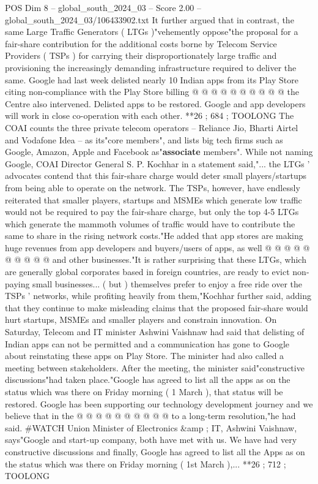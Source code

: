 \begin{textsample}{POS Dim 8 – global\_south\_2024\_03 – Score 2.00 – global\_south\_2024\_03/106433902.txt}
It further argued that in contrast, the same Large Traffic Generators ( LTGs )"vehemently oppose"the proposal for a fair-share contribution for the additional costs borne by Telecom Service Providers ( TSPs ) for carrying their disproportionately large traffic and provisioning the increasingly demanding infrastructure required to deliver the same.
Google had last week delisted nearly 10 Indian apps from its Play Store citing non-compliance with the Play Store billing @ @ @ @ @ @ @ @ @ @ the Centre also intervened.
Delisted apps to be restored.
Google and app developers will work in close co-operation with each other. **26 ; 684 ; TOOLONG The COAI counts the three private telecom operators -- Reliance Jio, Bharti Airtel and Vodafone Idea -- as its"core members", and lists big tech firms such as Google, Amazon, Apple and Facebook as"\textbf{associate} members".
While not naming Google, COAI Director General S.
P.
Kochhar in a statement said,"... the LTGs ' advocates contend that this fair-share charge would deter small players/startups from being able to operate on the network.
The TSPs, however, have endlessly reiterated that smaller players, startups and MSMEs which generate low traffic would not be required to pay the fair-share charge, but only the top 4-5 LTGs which generate the mammoth volumes of traffic would have to contribute the same to share in the rising network costs."He added that app stores are making huge revenues from app developers and buyers/users of apps, as well @ @ @ @ @ @ @ @ @ @ and other businesses."It is rather surprising that these LTGs, which are generally global corporates based in foreign countries, are ready to evict non-paying small businesses... ( but ) themselves prefer to enjoy a free ride over the TSPs ' networks, while profiting heavily from them,"Kochhar further said, adding that they continue to make misleading claims that the proposed fair-share would hurt startups, MSMEs and smaller players and constrain innovation.
On Saturday, Telecom and IT minister Ashwini Vaishnaw had said that delisting of Indian apps can not be permitted and a communication has gone to Google about reinstating these apps on Play Store.
The minister had also called a meeting between stakeholders.
After the meeting, the minister said"constructive discussions"had taken place."Google has agreed to list all the apps as on the status which was there on Friday morning ( 1 March ), that status will be restored.
Google has been supporting our technology development journey and we believe that in the @ @ @ @ @ @ @ @ @ @ to a long-term resolution,"he had said. \#WATCH Union Minister of Electronics \&amp ; IT, Ashwini Vaishnaw, says"Google and start-up company, both have met with us.
We have had very constructive discussions and finally, Google has agreed to list all the Apps as on the status which was there on Friday morning ( 1st March ),... **26 ; 712 ; TOOLONG

\end{textsample}
